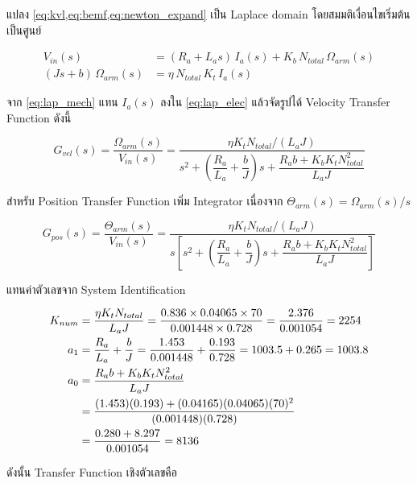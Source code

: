แปลง \cref{eq:kvl,eq:bemf,eq:newton_expand} เป็น Laplace domain
โดยสมมติเงื่อนไขเริ่มต้นเป็นศูนย์

\begin{align}
  V_{in}(s) &= (R_a + L_a s)\, I_a(s) + K_b\, N_{total}\, \Omega_{arm}(s)
  \label{eq:lap_elec} \\
  (Js + b)\, \Omega_{arm}(s) &= \eta\, N_{total}\, K_t\, I_a(s)
  \label{eq:lap_mech}
\end{align}

จาก \cref{eq:lap_mech} แทน $I_a(s)$ ลงใน \cref{eq:lap_elec}
แล้วจัดรูปได้ Velocity Transfer Function ดังนี้

\begin{equation}
  G_{vel}(s) = \frac{\Omega_{arm}(s)}{V_{in}(s)}
             = \frac{\eta K_t N_{total} / (L_a J)}
                    {s^2 + \left(\dfrac{R_a}{L_a} + \dfrac{b}{J}\right)s
                         + \dfrac{R_a b + K_b K_t N_{total}^2}{L_a J}}
  \label{eq:Gvel}
\end{equation}

สำหรับ Position Transfer Function เพิ่ม Integrator เนื่องจาก
$\Theta_{arm}(s) = \Omega_{arm}(s)/s$

\begin{equation}
  G_{pos}(s) = \frac{\Theta_{arm}(s)}{V_{in}(s)}
             = \frac{\eta K_t N_{total} / (L_a J)}
                    {s\left[s^2 + \left(\dfrac{R_a}{L_a} + \dfrac{b}{J}\right)s
                         + \dfrac{R_a b + K_b K_t N_{total}^2}{L_a J}\right]}
  \label{eq:Gpos}
\end{equation}

แทนค่าตัวเลขจาก System Identification

\begin{align}
  K_{num} &= \frac{\eta K_t N_{total}}{L_a J}
           = \frac{0.836 \times 0.04065 \times 70}{0.001448 \times 0.728}
           = \frac{2.376}{0.001054} = 2254 \notag \\
  a_1     &= \frac{R_a}{L_a} + \frac{b}{J}
           = \frac{1.453}{0.001448} + \frac{0.193}{0.728}
           = 1003.5 + 0.265 = 1003.8 \notag \\
  a_0     &= \frac{R_a b + K_b K_t N_{total}^2}{L_a J} \notag \\
           &= \frac{(1.453)(0.193) + (0.04165)(0.04065)(70)^2}{(0.001448)(0.728)} \notag \\
           &= \frac{0.280 + 8.297}{0.001054} = 8136 \notag
\end{align}

ดังนั้น Transfer Function เชิงตัวเลขคือ

